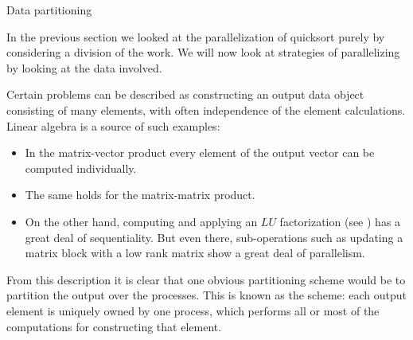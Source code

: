  {Data partitioning}

In the previous section we looked at the parallelization of quicksort
purely by considering a division of the work. We will now look at strategies
of parallelizing by looking at the data involved.

Certain problems can be described as constructing an output data object
consisting of many elements, with often independence of the element calculations.
Linear algebra is a source of such examples:
\begin{itemize}
\item In the matrix-vector product every element of the output vector
  can be computed individually.
\item The same holds for the matrix-matrix product.
\item On the other hand, computing and applying an $LU$ factorization
  (see ) has a great deal of sequentiality. But even there,
  sub-operations such as updating a matrix block with a low rank matrix
  show a great deal of parallelism.
\end{itemize}

From this description it is clear that one obvious partitioning scheme
would be to partition the output over the processes. This is known
as the  scheme: each output element is uniquely
owned by one process, which performs all or most of the computations
for constructing that element.

